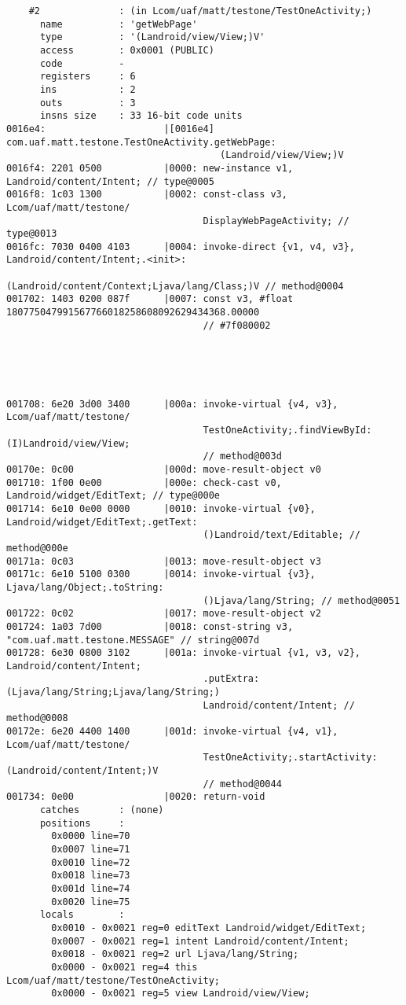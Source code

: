 \begin{lstlisting}
    #2              : (in Lcom/uaf/matt/testone/TestOneActivity;)
      name          : 'getWebPage'
      type          : '(Landroid/view/View;)V'
      access        : 0x0001 (PUBLIC)
      code          -
      registers     : 6
      ins           : 2
      outs          : 3
      insns size    : 33 16-bit code units
0016e4:                     |[0016e4] com.uaf.matt.testone.TestOneActivity.getWebPage:
                                      (Landroid/view/View;)V
0016f4: 2201 0500           |0000: new-instance v1, Landroid/content/Intent; // type@0005
0016f8: 1c03 1300           |0002: const-class v3, Lcom/uaf/matt/testone/
                                   DisplayWebPageActivity; // type@0013
0016fc: 7030 0400 4103      |0004: invoke-direct {v1, v4, v3}, Landroid/content/Intent;.<init>:
                                   (Landroid/content/Context;Ljava/lang/Class;)V // method@0004
001702: 1403 0200 087f      |0007: const v3, #float 180775047991567766018258608092629434368.00000
                                   // #7f080002





001708: 6e20 3d00 3400      |000a: invoke-virtual {v4, v3}, Lcom/uaf/matt/testone/
                                   TestOneActivity;.findViewById:(I)Landroid/view/View;
                                   // method@003d
00170e: 0c00                |000d: move-result-object v0
001710: 1f00 0e00           |000e: check-cast v0, Landroid/widget/EditText; // type@000e
001714: 6e10 0e00 0000      |0010: invoke-virtual {v0}, Landroid/widget/EditText;.getText:
                                   ()Landroid/text/Editable; // method@000e
00171a: 0c03                |0013: move-result-object v3
00171c: 6e10 5100 0300      |0014: invoke-virtual {v3}, Ljava/lang/Object;.toString:
                                   ()Ljava/lang/String; // method@0051
001722: 0c02                |0017: move-result-object v2
001724: 1a03 7d00           |0018: const-string v3, "com.uaf.matt.testone.MESSAGE" // string@007d
001728: 6e30 0800 3102      |001a: invoke-virtual {v1, v3, v2}, Landroid/content/Intent;
                                   .putExtra:(Ljava/lang/String;Ljava/lang/String;)
                                   Landroid/content/Intent; // method@0008
00172e: 6e20 4400 1400      |001d: invoke-virtual {v4, v1}, Lcom/uaf/matt/testone/
                                   TestOneActivity;.startActivity:(Landroid/content/Intent;)V
                                   // method@0044
001734: 0e00                |0020: return-void
      catches       : (none)
      positions     :
        0x0000 line=70
        0x0007 line=71
        0x0010 line=72
        0x0018 line=73
        0x001d line=74
        0x0020 line=75
      locals        :
        0x0010 - 0x0021 reg=0 editText Landroid/widget/EditText;
        0x0007 - 0x0021 reg=1 intent Landroid/content/Intent;
        0x0018 - 0x0021 reg=2 url Ljava/lang/String;
        0x0000 - 0x0021 reg=4 this Lcom/uaf/matt/testone/TestOneActivity;
        0x0000 - 0x0021 reg=5 view Landroid/view/View;


\end{lstlisting}
